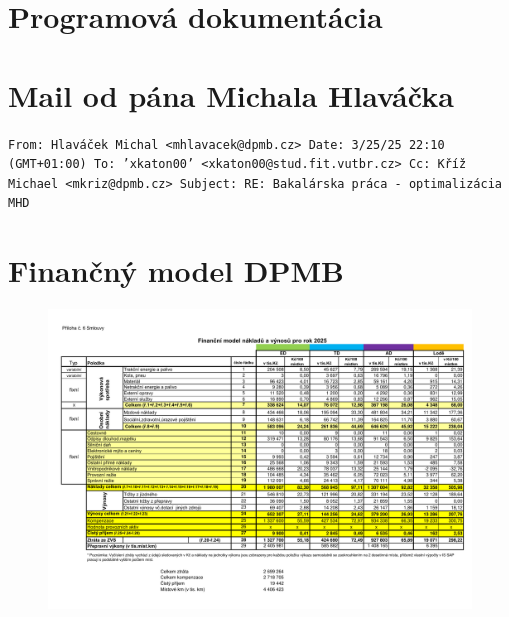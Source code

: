 \chapter{Programová dokumentácia}
\label{prilohy_programova_dokumentacia}






\chapter{Mail od pána Michala Hlaváčka}
\label{prilohy_mail_hlavacek}
\noindent \texttt{From: Hlaváček Michal <mhlavacek@dpmb.cz> \newline
    Date: 3/25/25 22:10 (GMT+01:00) \newline
    To: 'xkaton00' <xkaton00@stud.fit.vutbr.cz> \newline
    Cc: Kříž Michael <mkriz@dpmb.cz> \newline
    Subject: RE: Bakalárska práca - optimalizácia MHD
}



\chapter{Finančný model DPMB}
\label{prilohy_financny_model}
\begin{figure}[h!]
    \centering
    \includegraphics[width=\textwidth,angle=-90]{Financni_model_DPMB_2025.pdf}
\end{figure}




